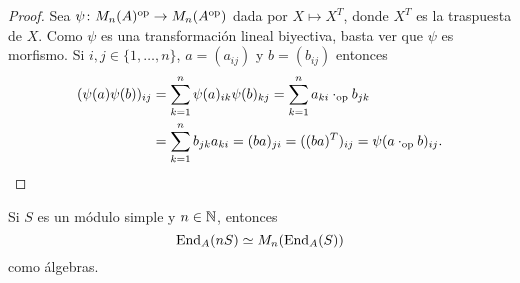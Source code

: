 \begin{proof}
	Sea $\psi\colon M_n(A)^{\operatorname{op}}\to M_n(A^{\operatorname{op}})$ dada por $X\mapsto X^T$,
	donde $X^T$ es la traspuesta de $X$. Como $\psi$ es una transformación lineal biyectiva, basta
	ver
	que $\psi$ es morfismo. Si $i,j\in\{1,\dots,n\}$, $a=(a_{ij})$ y $b=(b_{ij})$ entonces
	\begin{align*}
		(\psi(a)\psi(b))_{ij}&=\sum_{k=1}^n \psi(a)_{ik}\psi(b)_{kj}=\sum_{k=1}^n a_{ki}\cdot_{\operatorname{op}}b_{jk}\\
		&=\sum_{k=1}^n b_{jk}a_{ki}=(ba)_{ji}=((ba)^T)_{ij}=\psi(a\cdot_{\operatorname{op}}b)_{ij}.\qedhere
	\end{align*}
\end{proof}

\begin{lemma}
	\label{lem:simple}
	Si $S$ es un módulo simple y $n\in\mathbb{N}$, entonces 
	\[
		\operatorname{End}_A(nS)\simeq M_n(\operatorname{End}_A(S))
	\]
	como álgebras.
\end{lemma}

